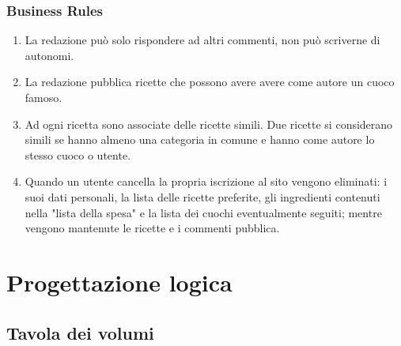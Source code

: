 \documentclass[12pt]{extarticle}
\begin{document}
\subsubsection{Business Rules}
\begin{enumerate}
    \item La redazione può solo rispondere ad altri commenti, non può scriverne di autonomi.
    \item La redazione pubblica ricette che possono avere avere come autore un cuoco famoso.
    \item Ad ogni ricetta sono associate delle ricette simili. Due ricette si considerano simili se hanno almeno una categoria in comune e hanno come autore lo stesso cuoco o utente.
    \item Quando un utente cancella la propria iscrizione al sito vengono eliminati: i suoi dati personali, la lista delle ricette preferite, gli ingredienti contenuti nella "lista della spesa" e la lista dei cuochi eventualmente seguiti; mentre vengono mantenute le ricette e i commenti pubblica.
\end{enumerate}


\section{Progettazione logica}
\subsection{Tavola dei volumi}
\end{document}
